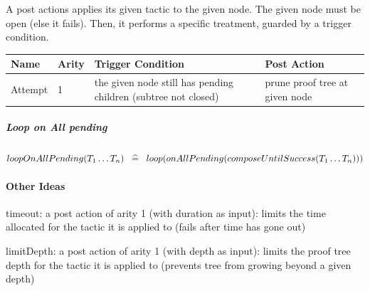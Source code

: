 A post actions applies its given tactic to the given node. The given node must be open (else it fails). Then, it performs a specific treatment, guarded by a trigger condition. 

\begin{center}
    \begin{tabular}{ | l | l | l | l | p{5cm} |}
    \hline
	Name & Arity & Trigger Condition & Post Action \\ \hline
	Attempt & 1 & the given node still has pending children (subtree not closed) & prune proof tree at given node  \\ \hline
    \end{tabular}
\end{center}

\subparagraph{Loop on All pending}

$loopOnAllPending(T_1 \ldots T_n) \;\;\mathrel{\widehat=}\;\; loop(onAllPending(composeUntilSuccess(T_1 \ldots T_n)))  $

\paragraph{Other Ideas}

    timeout: a post action of arity 1 (with duration as input): limits the time allocated for the tactic it is applied to (fails after time has gone out)

    limitDepth: a post action of arity 1 (with depth as input): limits the proof tree depth for the tactic it is applied to (prevents tree from growing beyond a given depth)
